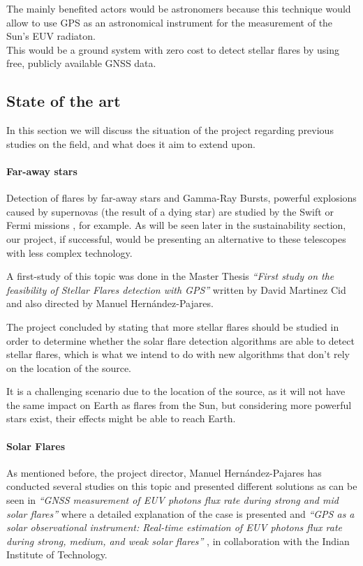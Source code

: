The mainly benefited actors would be astronomers because this technique would allow to use GPS as an astronomical instrument for the measurement of the Sun’s EUV radiaton.\\

This would be a ground system with zero cost to detect stellar flares by using free, publicly available GNSS data.

\subsection{State of the art}

In this section we will discuss the situation of the project regarding previous studies on the field, and what does it aim to extend upon.          

\paragraph{Far-away stars}

Detection of flares by far-away stars and Gamma-Ray Bursts, powerful explosions caused by supernovas (the result of a dying star) are studied by the Swift or Fermi missions \cite{gehrels2013gamma}, for example. As will be seen later in the sustainability section, our project, if successful, would be presenting an alternative to these telescopes with less complex technology.

A first-study of this topic was done in the Master Thesis \textit{“First study on the feasibility of Stellar Flares detection with GPS”} \cite{martinez2016first} written by David Martinez Cid and also directed by Manuel Hernández-Pajares.

The project concluded by stating that more stellar flares should be studied in order to determine whether the solar flare detection algorithms are able to detect stellar flares, which is what we intend to do with new algorithms that don’t rely on the location of the source.

It is a challenging scenario due to the location of the source, as it will not have the same impact on Earth as flares from the Sun, but considering more powerful stars exist, their effects might be able to reach Earth.

\paragraph{Solar Flares}

As mentioned before, the project director, Manuel Hernández-Pajares has conducted several studies on this topic and presented different solutions as can be seen in \textit{“GNSS measurement of EUV photons flux rate during strong and mid solar flares”} \cite{hernandez2012gnss} where a detailed explanation of the case is presented and \textit{“GPS as a solar observational instrument: Real-time estimation of EUV photons flux rate during strong, medium, and weak solar flares”} \cite{singh2015gps}, in collaboration with the Indian Institute of Technology.\\

